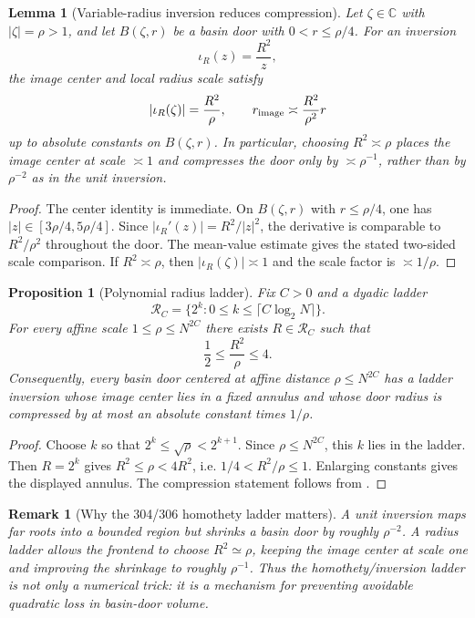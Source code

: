 \documentclass[11pt]{article}
\newtheorem{proposition}[definition]{Proposition}
\newtheorem{lemma}[definition]{Lemma}
\newtheorem{remark}[definition]{Remark}
\newcommand{\C}{\mathbb C}
\begin{document}
\begin{lemma}[Variable-radius inversion reduces compression]\label{lem:variable-radius-inversion}
Let $\zeta\in\C$ with $|\zeta|=\rho>1$, and let $B(\zeta,r)$ be a basin door with $0<r\le \rho/4$.  For an inversion
\[
        \iota_R(z)=\frac{R^2}{z},
\]
the image center and local radius scale satisfy
\[
        |\iota_R(\zeta)|=\frac{R^2}{\rho},
        \qquad
        r_{\rm image}\asymp \frac{R^2}{\rho^2}r
\]
up to absolute constants on $B(\zeta,r)$.  In particular, choosing $R^2\asymp\rho$ places the image center at scale $\asymp1$ and compresses the door only by $\asymp\rho^{-1}$, rather than by $\rho^{-2}$ as in the unit inversion.
\end{lemma}

\begin{proof}
The center identity is immediate.  On $B(\zeta,r)$ with $r\le\rho/4$, one has $|z|\in[3\rho/4,5\rho/4]$.  Since $|\iota_R'(z)|=R^2/|z|^2$, the derivative is comparable to $R^2/\rho^2$ throughout the door.  The mean-value estimate gives the stated two-sided scale comparison.  If $R^2\asymp\rho$, then $|\iota_R(\zeta)|\asymp1$ and the scale factor is $\asymp1/\rho$.
\end{proof}

\begin{proposition}[Polynomial radius ladder]\label{prop:radius-ladder}
Fix $C>0$ and a dyadic ladder
\[
        \mathcal R_C=\{2^k:0\le k\le \lceil C\log_2 N\rceil\}.
\]
For every affine scale $1\le\rho\le N^{2C}$ there exists $R\in\mathcal R_C$ such that
\[
        \frac12\le \frac{R^2}{\rho}\le4.
\]
Consequently, every basin door centered at affine distance $\rho\le N^{2C}$ has a ladder inversion whose image center lies in a fixed annulus and whose door radius is compressed by at most an absolute constant times $1/\rho$.
\end{proposition}

\begin{proof}
Choose $k$ so that $2^k\le\sqrt\rho<2^{k+1}$.  Since $\rho\le N^{2C}$, this $k$ lies in the ladder.  Then $R=2^k$ gives $R^2\le\rho<4R^2$, i.e. $1/4< R^2/\rho\le1$.  Enlarging constants gives the displayed annulus.  The compression statement follows from .
\end{proof}

\begin{remark}[Why the 304/306 homothety ladder matters]
A unit inversion maps far roots into a bounded region but shrinks a basin door by roughly $\rho^{-2}$.  A radius ladder allows the frontend to choose $R^2\simeq\rho$, keeping the image center at scale one and improving the shrinkage to roughly $\rho^{-1}$.  Thus the homothety/inversion ladder is not only a numerical trick: it is a mechanism for preventing avoidable quadratic loss in basin-door volume.
\end{remark}
\end{document}
